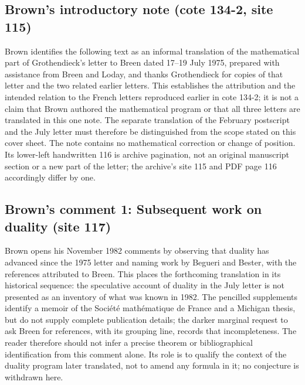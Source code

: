\documentclass[10pt,oneside]{book}
\begin{document}
\subsection*{Brown's introductory note (cote 134-2, site 115)}
Brown identifies the following text as an informal translation of the mathematical part of Grothendieck's letter to Breen dated 17--19 July 1975, prepared with assistance from Breen and Loday, and thanks Grothendieck for copies of that letter and the two related earlier letters. This establishes the attribution and the intended relation to the French letters reproduced earlier in cote 134-2; it is not a claim that Brown authored the mathematical program or that all three letters are translated in this one note. The separate translation of the February postscript and the July letter must therefore be distinguished from the scope stated on this cover sheet. The note contains no mathematical correction or change of position. Its lower-left handwritten 116 is archive pagination, not an original manuscript section or a new part of the letter; the archive's site 115 and PDF page 116 accordingly differ by one.

\subsection*{Brown's comment 1: Subsequent work on duality (site 117)}
Brown opens his November 1982 comments by observing that duality has advanced since the 1975 letter and naming work by Begueri and Bester, with the references attributed to Breen. This places the forthcoming translation in its historical sequence: the speculative account of duality in the July letter is not presented as an inventory of what was known in 1982. The pencilled supplements identify a memoir of the Société mathématique de France and a Michigan thesis, but do not supply complete publication details; the darker marginal request to ask Breen for references, with its grouping line, records that incompleteness. The reader therefore should not infer a precise theorem or bibliographical identification from this comment alone. Its role is to qualify the context of the duality program later translated, not to amend any formula in it; no conjecture is withdrawn here.
\end{document}
